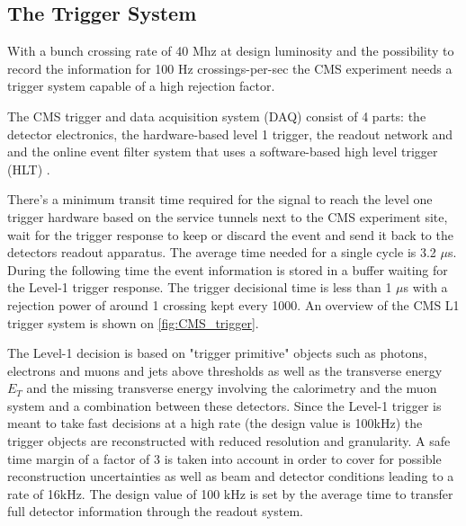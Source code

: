 \clearpage

\subsection{The Trigger System}

With a bunch crossing rate of 40 Mhz at design luminosity and the possibility to record the information for 100 Hz crossings-per-sec the CMS experiment needs a trigger system capable of a high rejection factor.

The CMS trigger and data acquisition system (DAQ) consist of 4 parts: the detector electronics, the hardware-based level 1 trigger, the readout network and and the online event filter system that uses a software-based high level trigger (HLT) \cite{bib:cmstdr:trigger}.

There's a minimum transit time required for the signal to reach the level one trigger hardware based on the service tunnels next to the CMS experiment site, wait for the trigger response to keep or discard the event and send it back to the detectors readout apparatus. The average time needed for a single cycle is 3.2 $\mu$s. During the following time the event information is stored in a buffer waiting for the Level-1 trigger response. The trigger decisional time is less than 1 $\mu$s with a rejection power of around 1 crossing kept every 1000. An overview of the CMS L1 trigger system is shown on \autoref{fig:CMS_trigger}.

The Level-1 decision is based on "trigger primitive" objects such as photons, electrons and muons and jets above thresholds as well as the transverse energy $E_{T}$ and the missing transverse energy \met involving the calorimetry and the muon system and a combination between these detectors. Since the Level-1 trigger is meant to take fast decisions at a high rate (the design value is 100kHz) the trigger objects are reconstructed with reduced resolution and granularity. A safe time margin of a factor of 3 is taken into account in order to cover for possible reconstruction uncertainties as well as beam and detector conditions leading to a rate of 16kHz. The design value of 100 kHz is set by the average time to transfer full detector information through the readout system.

